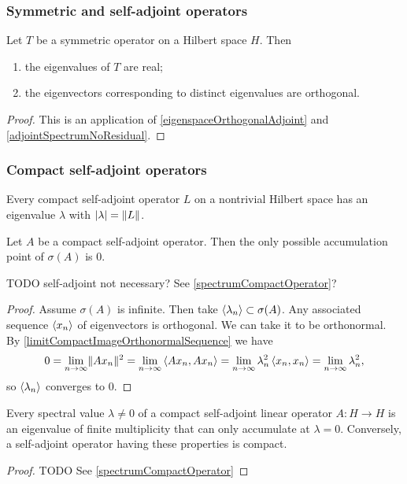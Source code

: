 \subsubsection{Symmetric and self-adjoint operators}
\begin{proposition}
Let $T$ be a symmetric operator on a Hilbert space $H$. Then
\begin{enumerate}
\item the eigenvalues of $T$ are real;
\item the eigenvectors corresponding to distinct eigenvalues are orthogonal.
\end{enumerate}
\end{proposition}
\begin{proof}
This is an application of \ref{eigenspaceOrthogonalAdjoint} and \ref{adjointSpectrumNoResidual}.
\end{proof}

\subsubsection{Compact self-adjoint operators}
\begin{proposition}
Every compact self-adjoint operator $L$ on a nontrivial Hilbert space has an eigenvalue $\lambda$ with $|\lambda| = \lVert L\rVert$.
\end{proposition}

\begin{proposition}
Let $A$ be a compact self-adjoint operator. Then the only possible accumulation point of $\sigma(A)$ is $0$.
\end{proposition}
TODO self-adjoint not necessary? See \ref{spectrumCompactOperator}?
\begin{proof}
Assume $\sigma(A)$ is infinite. Then take $\left\langle \lambda_n \right\rangle\subset \sigma(A)$. Any associated sequence $\left\langle x_n \right\rangle$ of eigenvectors is orthogonal. We can take it to be orthonormal. By \ref{limitCompactImageOrthonormalSequence} we have
\[ 0 = \lim_{n\to\infty} \lVert Ax_n\rVert^2 = \lim_{n\to\infty}\left\langle Ax_n,Ax_n \right\rangle = \lim_{n\to\infty}\lambda_n^2\left\langle x_n,x_n \right\rangle = \lim_{n\to\infty}\lambda_n^2, \]
so $\left\langle \lambda_n \right\rangle$ converges to $0$.
\end{proof}

\begin{theorem}
Every spectral value $\lambda\neq 0$ of a compact self-adjoint linear
operator $A : H \to H$ is an eigenvalue of finite multiplicity that can only
accumulate at $\lambda = 0$. Conversely, a self-adjoint operator having these
properties is compact.
\end{theorem}
\begin{proof}
TODO See \ref{spectrumCompactOperator}
\end{proof}

